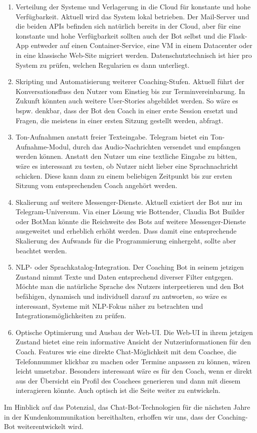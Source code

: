     \begin{enumerate}
        \item Verteilung der Systeme und Verlagerung in die Cloud für konstante und hohe Verfügbarkeit. Aktuell wird das System lokal betrieben. Der Mail-Server und die beiden APIs befinden sich natürlich bereits in der Cloud, aber für eine konstante und hohe Verfügbarkeit sollten auch der Bot selbst und die Flask-App entweder auf einen Container-Service, eine VM in einem Datacenter oder in eine klassische Web-Site migriert werden. Datenschutztechnisch ist hier pro System zu prüfen, welchen Regularien es dann unterliegt. 
        \item Skripting und Automatisierung weiterer Coaching-Stufen. Aktuell führt der Konversationsfluss den Nutzer vom Einstieg bis zur Terminvereinbarung. In Zukunft könnten auch weitere User-Stories abgebildet werden. So wäre es bspw. denkbar, dass der Bot den Coach in einer erste Session ersetzt und Fragen, die meistens in einer ersten Sitzung gestellt werden, abfragt.
        \item Ton-Aufnahmen anstatt freier Texteingabe. Telegram bietet ein Ton-Aufnahme-Modul, durch das Audio-Nachrichten versendet und empfangen werden können. Anstatt den Nutzer um eine textliche Eingabe zu bitten, wäre es interessant zu testen, ob Nutzer nicht lieber eine Sprachnachricht schicken. Diese kann dann zu einem beliebigen Zeitpunkt bis zur ersten Sitzung vom entsprechenden Coach angehört werden.
        \item Skalierung auf weitere Messenger-Dienste. Aktuell existiert der Bot nur im Telegram-Universum. Via einer Lösung wie Bottender, Claudia Bot Builder oder BotMan könnte die Reichweite des Bots auf weitere Messenger-Dienste ausgeweitet und erheblich erhöht werden. Dass damit eine entsprechende Skalierung des Aufwands für die Programmierung einhergeht, sollte aber beachtet werden.
        \item NLP- oder Sprachkatalog-Integration. Der Coaching Bot in seinem jetzigen Zustand nimmt Texte und Daten entsprechend diverser Filter entgegen. Möchte man die natürliche Sprache des Nutzers interpretieren und den Bot befähigen, dynamisch und individuell darauf zu antworten, so wäre es interessant, Systeme mit NLP-Fokus näher zu betrachten und Integrationsmöglichkeiten zu prüfen. 
        \item Optische Optimierung und Ausbau der Web-UI. Die Web-UI in ihrem jetzigen Zustand bietet eine rein informative Ansicht der Nutzerinformationen für den Coach. Features wie eine direkte Chat-Möglichkeit mit dem Coachee, die Telefonnummer klickbar zu machen oder Termine anpassen zu können, wären leicht umsetzbar. Besonders interessant wäre es für den Coach, wenn er direkt aus der Übersicht ein Profil des Coachees generieren und dann mit diesem interagieren könnte. Auch optisch ist die Seite weiter zu entwickeln.
        
    \end{enumerate}

    Im Hinblick auf das Potenzial, das Chat-Bot-Technologien für die nächsten Jahre in der Kundenkommunikation bereithalten, erhoffen wir uns, dass der Coaching-Bot weiterentwickelt wird.